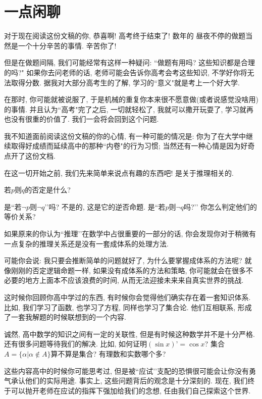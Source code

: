 

    \section{一点闲聊}
    对于现在阅读这份文稿的你, 恭喜啊! 高考终于结束了! 数年的
    昼夜不停的做题当然是一个十分辛苦的事情. 辛苦你了!
    
    但是在做题间隔, 我们可能经常有这样一种疑问: ``做题有用吗? 这些知识都是合理的吗?" 如果你去问老师的话, 老师可能会告诉你高考会考这些知识, 不学好你将无法取得分数. 据我对大部分高考生的了解, 学习的``意义"就是考上一个好大学. 

    在那时, 你可能就被说服了, 于是机械的重复你本来很不愿意做(或者说感觉没啥用)的事情. 并且认为``高考"完了之后, 一切就轻松了, 我就可以撒开玩耍了, 学习就再也没有很重的价值了. 我们一会将会回到这个问题. 

    我不知道面前阅读这份文稿的你的心情, 有一种可能的情况是: 你为了在大学中继续取得好成绩而延续高中的那种``内卷"的行为习惯; 当然还有一种心情是因为好奇点开了这份文档. 

    在这一切开始之前, 我们先来简单来说点有趣的东西吧! 是关于推理相关的. 

    \begin{eg}
        若$p$则$q$的否定是什么?
    \end{eg}

    是``若$\neg p$则$\neg q$’’吗? 不是的, 这是它的逆否命题. 是``若$p$则$\neg q$吗?’’ 你怎么判定他们的等价关系? 

    如果原来的你认为``推理’’在数学中占很重要的一部分的话, 你会发现你对于稍微有一点复杂的推理关系还是没有一套成体系的处理方法. 

    可能你会说: 我只要会推断简单的问题就好了, 为什么要掌握成体系的方法呢? 就像刚刚的否定逻辑命题一样, 如果没有成体系的方法和策略, 你可能就会在很多不必要的地方上面本不应该浪费的时间, 从而无法迎接未来来自真实世界的挑战. 

    这时候你回顾你高中学过的东西, 有时候你会觉得他们确实存在着一套知识体系. 比如, 我们学习了函数, 也学习了方程, 同样也学习了集合论. 他们互相联系, 形成了一套我解题的时候联想到的一个内容. 

    诚然, 高中数学的知识之间有一定的关联性, 但是有时候这种数学并不是十分严格. 还有很多问题等待我们的解决. 比如, 如何证明$(\sin x)’=\cos x$? 集合$A=\{\alpha|\alpha\not \in A \}$算不算是集合? 有理数和实数哪个多? 

    这些内容高中的时候你可能思考过, 但是被``应试’’支配的恐惧很可能会让你没有勇气承认他们的实际用途. 事实上, 这些问题背后的观念是十分深刻的. 现在, 我们终于可以抛开老师在应试的指挥下强加给我们的念想, 任由我们自己探索这个世界. 

